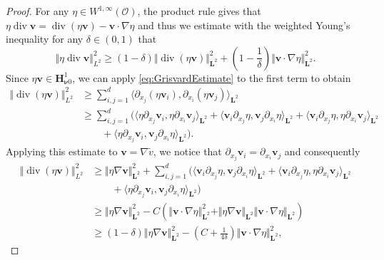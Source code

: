 \documentclass{m2an}
\newcommand{\dom}{\mathcal{O}} %
\newcommand{\nv}{\boldsymbol{\nu}}
\renewcommand{\v}{\mathbf{v}}
\renewcommand{\div}{\operatorname{div}}
\newcommand{\bH}{{\mathbf H}}
\newcommand{\bL}{\mathbf{L}}
\newcommand{\spl}{\langle}
\newcommand{\spr}{\rangle}
\theoremstyle{plain}
\theoremstyle{definition}
\begin{document}
\begin{proof}
   For any $\eta \in W^{1,\infty}(\dom)$, the product rule gives that $\eta \div \v = \div(\eta \v) - \v \cdot \nabla \eta$ and thus we estimate with the weighted Young's inequality for any $\delta \in (0,1)$ that 
   \begin{equation}\label{eq:etaDivVFirstEst}
      \Vert \eta \div \v \Vert^2_{L^2} \ge (1-\delta) \Vert \div (\eta \v) \Vert^2_{\bL^2} + (1-\frac{1}{\delta}) \Vert \v \cdot \nabla \eta \Vert_{\bL^2}^2. 
   \end{equation}
   Since $\eta \v \in \bH^1_{\nv 0}$, we can apply \eqref{eq:GrisvardEstimate} to the first term to obtain 
   \begin{equation*}
      \begin{aligned}
         \Vert \div (\eta \v) \Vert^2_{L^2} &\ge \sum_{i,j=1}^d \spl \partial_{x_j} (\eta \v_i), \partial_{x_i} (\eta \v_j) \spr_{\bL^2} \\
         &\ge \sum_{i,j=1}^d \big( \spl \eta \partial_{x_j} \v_{i}, \eta \partial_{x_i} \v_{j} \spr_{\bL^2} + \spl \v_i \partial_{x_j} \eta, \v_j \partial_{x_i} \eta \spr_{\bL^2} + \spl \v_i \partial_{x_j} \eta, \eta \partial_{x_i} \v_j \spr_{\bL^2} \\
         &\qquad+ \spl \eta \partial_{x_j} \v_i, \v_j \partial_{x_i} \eta \spr_{\bL^2} \big). 
      \end{aligned} 
   \end{equation*} 
   Applying this estimate to $\v = \nabla \tilde{v}$, we notice that $\partial_{x_j} \v_i = \partial_{x_i} \v_j$ and consequently
   \begin{equation*}
      \begin{aligned}
         \Vert \div (\eta \v) \Vert^2_{L^2} &\ge \Vert \eta \nabla \v \Vert^2_{\bL^2} + \sum_{i,j=1}^d \big( \spl \v_i \partial_{x_j} \eta, \v_j \partial_{x_i} \eta \spr_{\bL^2} + \spl \v_i \partial_{x_j} \eta, \eta \partial_{x_i} \v_j \spr_{\bL^2} \\
         &\qquad+ \spl \eta \partial_{x_j} \v_i, \v_j \partial_{x_i} \eta \spr_{\bL^2} \big) \\
         &\ge \Vert \eta \nabla \v \Vert^2_{\bL^2} - C \left( \Vert \v \cdot \nabla \eta \Vert^2_{\bL^2} + \Vert \eta \nabla \v \Vert_{\bL^2} \Vert \v \cdot \nabla \eta \Vert_{\bL^2} \right) \\
         &\ge  (1-\delta) \Vert \eta \nabla \v \Vert^2_{\bL^2} - (C+\frac{1}{4\delta}) \Vert \v \cdot \nabla \eta \Vert^2_{\bL^2},
      \end{aligned} 
   \end{equation*}

\end{proof}
\end{document}
